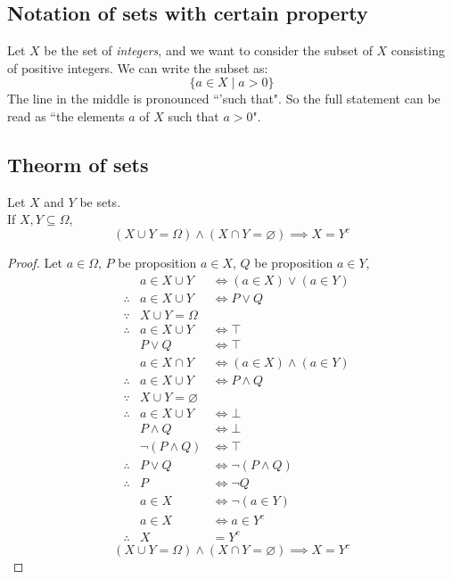 \documentclass[a4paper]{article}
\begin{document}
\subsection{Notation of sets with certain property}
Let $X$ be the set of \emph{integers}, and we want to consider the subset of $X$ consisting of positive integers. We can write the subset as: 
$$\{ a \in X \mid a > 0\}$$
The line in the middle is pronounced ``'such that". So the full statement can be read as ``the elements $a$ of $X$ such that $a > 0$".

\subsection{Theorm of sets}
\begin{thm}
Let $X$ and $Y$ be sets.\\
If $X, Y \subseteq \Omega$, $$(X \cup Y = \Omega) \land (X \cap Y = \varnothing) \implies X = Y^c$$
\end{thm}
\begin{proof}
Let $a \in \Omega$,
$P$ be proposition $a \in X$, $Q$ be proposition $a \in Y$,
\begin{align*}
	&&a \in X \cup Y &\iff (a \in X) \lor (a \in Y) \tag{Union definition}\\
	&\therefore &a \in X \cup Y &\iff P \lor Q\\
	&\because &X \cup Y = \Omega \\
	&\therefore &a \in X \cup Y &\iff \top\\
	&&P \lor Q &\iff \top\\
	&&a \in X \cap Y &\iff (a \in X) \land (a \in Y) \tag{Intersection definition}\\
	&\therefore &a \in X \cup Y &\iff P \land Q\\
	&\because &X \cup Y = \varnothing\\
	&\therefore &a \in X \cup Y &\iff \bot\\
	&&P \land Q &\iff \bot\\
	&&\lnot (P \land Q) &\iff \top\\
	&\therefore &P \lor Q &\iff \lnot (P \land Q)\\
	&\therefore &P &\iff \lnot Q\\
	&& a \in X &\iff \lnot(a \in Y)\\
	&& a \in X &\iff a \in Y^c \tag{Complement definition}\\
	&\therefore &X &= Y^c
\end{align*}
$$(X \cup Y = \Omega) \land (X \cap Y = \varnothing) \implies X = Y^c$$
\end{proof}
\end{document}
